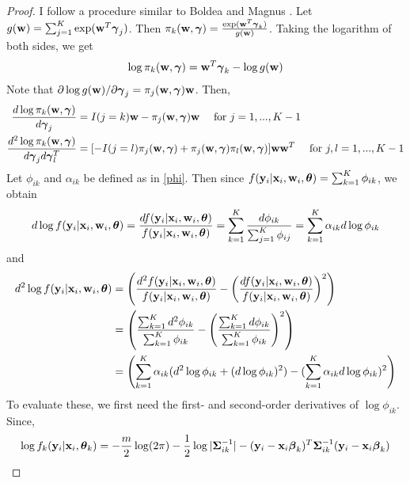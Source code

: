 \begin{proof}
I follow a procedure similar to Boldea and Magnus \cite{boldea2009}. Let $g(\mathbf  w)=\sum_{j=1}^{K}\exp(\mathbf  w^{T}\boldsymbol \gamma_{j})$. Then $\pi_{k}(\mathbf w,\boldsymbol\gamma)=\frac{\exp( \mathbf  w^{T}\boldsymbol\gamma_{k})}{g(\mathbf  w)}$. Taking the logarithm of both sides, we get
\begin{align}
\log \pi_{k}(\mathbf w,\boldsymbol\gamma)=\mathbf w^{T}\boldsymbol\gamma_{k} - \log g(\mathbf w)
\label{wts}
\end{align}
Note that $\partial\log g(\mathbf w)/\partial \boldsymbol \gamma_{j}=\pi_{j}(\mathbf w,\boldsymbol\gamma) \mathbf w$. Then,
\begin{align}
\frac{d\log\pi_{k}(\mathbf w,\boldsymbol\gamma)}{d\boldsymbol\gamma_{j}}&=I(j=k)\mathbf w-\pi_{j}(\mathbf w,\boldsymbol\gamma)\mathbf w\quad\text{ for }j=1,...,K-1\nonumber\\
\frac{d^{2}\log\pi_{k}(\mathbf w,\boldsymbol\gamma)}{d\boldsymbol\gamma_{j}d\boldsymbol\gamma_{l}^{T}}&=[-I(j=l)\pi_{j}(\mathbf w,\boldsymbol\gamma)+\pi_{j}(\mathbf w,\boldsymbol\gamma)\pi_{l}(\mathbf w,\boldsymbol\gamma)]\mathbf w\mathbf w^{T}\quad\text{ for }j,l=1,...,K-1
\label{logpi}
\end{align}
Let $\phi_{ik}$ and $\alpha_{ik}$ be defined as in \eqref{phi}. Then since $f(\mathbf y_{i}|\mathbf x_{i},\mathbf w_{i},\boldsymbol\theta)=\sum^{K}_{k=1}\phi_{ik}$, we obtain
\begin{align}
d\log f(\mathbf y_{i}|\mathbf x_{i},\mathbf w_{i},\boldsymbol\theta)=\frac{d f(\mathbf y_{i}|\mathbf x_{i},\mathbf w_{i},\boldsymbol\theta)}{f(\mathbf y_{i}|\mathbf x_{i},\mathbf w_{i},\boldsymbol\theta)}=\sum^{K}_{k=1}\frac{d\phi_{ik}}{\sum^{K}_{j=1}\phi_{ij}}=\sum^{K}_{k=1}\alpha_{ik}d\log \phi_{ik}\label{dlogf}
\end{align}
and 
\begin{align}\label{d2logf}
d^{2}\log f(\mathbf y_{i}|\mathbf x_{i},\mathbf w_{i},\boldsymbol\theta)&=\left(\frac{d^{2} f(\mathbf y_{i}|\mathbf x_{i},\mathbf w_{i},\boldsymbol\theta)}{f(\mathbf y_{i}|\mathbf x_{i},\mathbf w_{i},\boldsymbol\theta)}-\left(\frac{d f(\mathbf y_{i}|\mathbf x_{i},\mathbf w_{i},\boldsymbol\theta)}{f(\mathbf y_{i}|\mathbf x_{i},\mathbf w_{i},\boldsymbol\theta)}\right)^{2}\right)\nonumber\\
&=\left(\frac{\sum^{K}_{k=1}d^{2}\phi_{ik}}{\sum^{K}_{k=1}\phi_{ik}}-\left(\frac{\sum^{K}_{k=1}d \phi_{ik}}{\sum^{K}_{k=1}\phi_{ik}}\right)^{2}\right)\nonumber\\
&=\left(\sum^{K}_{k=1}\alpha_{ik}(d^{2}\log \phi_{ik}+(d\log \phi_{ik})^{2})-(\sum^{K}_{k=1}\alpha_{ik}d\log \phi_{ik})^{2}\right)
\end{align}
To evaluate these, we first need the first- and second-order derivatives of $\log \phi_{ik}$.  Since, 
\begin{align*}
\log f_{k}(\B y_i|\B x_{i},\BS\theta_{k})=-\frac{m}{2}\log(2\pi)-\frac{1}{2}\log |\BS\Sigma_{ik}^{-1}|-(\B y_i-\B x_{i}\BS \beta_{k})^{T}\BS\Sigma_{ik}^{-1}(\B y_i-\B x_{i}\BS\beta_{k})

\end{align*}
\end{proof}
